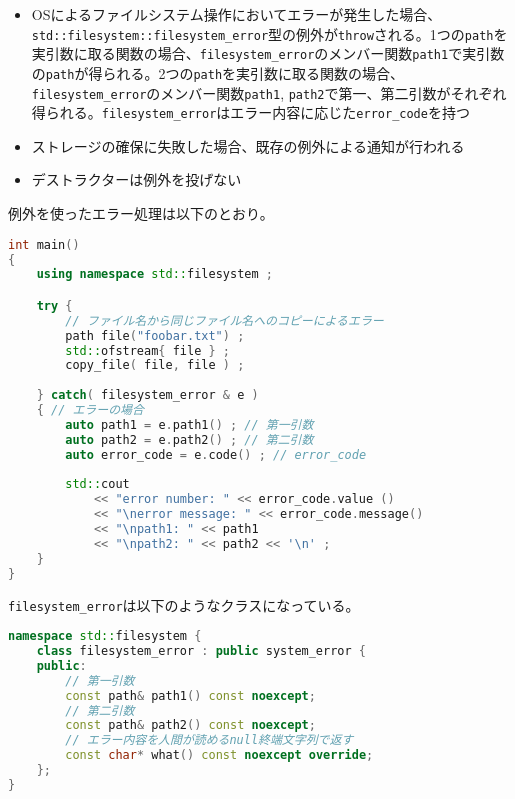 \begin{itemize}
\item
  OSによるファイルシステム操作においてエラーが発生した場合、\lstinline!std::filesystem::filesystem_error!型の例外が\lstinline!throw!される。1つの\lstinline!path!を実引数に取る関数の場合、\lstinline!filesystem_error!のメンバー関数\lstinline!path1!で実引数の\lstinline!path!が得られる。2つの\lstinline!path!を実引数に取る関数の場合、\lstinline!filesystem_error!のメンバー関数\lstinline!path1!,
  \lstinline!path2!で第一、第二引数がそれぞれ得られる。\lstinline!filesystem_error!はエラー内容に応じた\lstinline!error_code!を持つ
\item
  ストレージの確保に失敗した場合、既存の例外による通知が行われる
\item
  デストラクターは例外を投げない
\end{itemize}

例外を使ったエラー処理は以下のとおり。

\begin{lstlisting}[language=C++]
int main()
{
    using namespace std::filesystem ;

    try {
        // ファイル名から同じファイル名へのコピーによるエラー
        path file("foobar.txt") ;
        std::ofstream{ file } ;
        copy_file( file, file ) ;
       
    } catch( filesystem_error & e )
    { // エラーの場合
        auto path1 = e.path1() ; // 第一引数
        auto path2 = e.path2() ; // 第二引数
        auto error_code = e.code() ; // error_code
        
        std::cout
            << "error number: " << error_code.value ()
            << "\nerror message: " << error_code.message() 
            << "\npath1: " << path1
            << "\npath2: " << path2 << '\n' ;
    }
}
\end{lstlisting}

\lstinline!filesystem_error!は以下のようなクラスになっている。

\begin{lstlisting}[language=C++]
namespace std::filesystem {
    class filesystem_error : public system_error {
    public:
        // 第一引数
        const path& path1() const noexcept;
        // 第二引数
        const path& path2() const noexcept;
        // エラー内容を人間が読めるnull終端文字列で返す
        const char* what() const noexcept override;
    };
}
\end{lstlisting}


